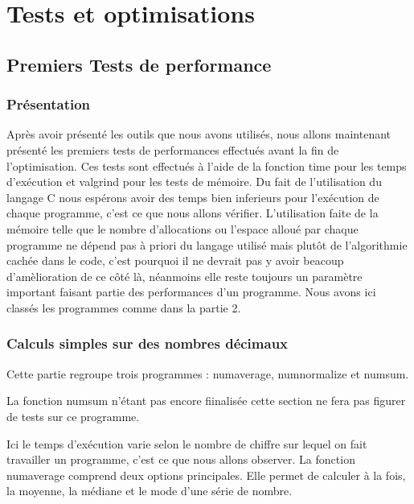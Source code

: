
\chapter{Tests et optimisations}
\label{chap:tests et optimisations}

\section{Premiers Tests de performance}

\subsection{Pr\'esentation}

Apr\`es avoir pr\'esent\'e les outils que nous avons utilis\'es, nous allons maintenant pr\'esent\'e les premiers tests de performances effectu\'es 
avant la fin de l'optimisation.
Ces tests sont effectu\'es \`a l'aide de la fonction time pour les temps d'ex\'ecution et valgrind pour les tests de m\'emoire.
Du fait de l'utilisation du langage C nous esp\'erons avoir des temps bien inferieurs pour l'ex\'ecution de chaque programme, c'est ce que nous allons
 v\'erifier.
L'utilisation faite de la m\'emoire telle que le nombre d'allocations ou l'espace allou\'e par chaque programme ne d\'epend pas \`a priori du langage
 utilis\'e mais plut\^ot de l'algorithmie cach\'ee dans le code, c'est pourquoi il ne devrait pas y avoir beacoup d'am\`elioration de ce c\^ot\'e l\`a,
n\'eanmoins elle reste toujours un param\`etre important faisant partie des performances d'un programme.
Nous avons ici class\'es les programmes comme dans la partie 2.

\subsection{Calculs simples sur des nombres d\'ecimaux}

Cette partie regroupe trois programmes : numaverage, numnormalize et numsum.
\newline

La fonction numsum n'\'etant pas encore fiinalis\'ee cette section ne fera pas figurer de tests sur ce programme.
\newline

Ici le temps d'ex\'ecution varie selon le nombre de chiffre sur lequel on fait travailler un programme, c'est ce que nous allons observer.
La fonction numaverage comprend deux options principales. Elle permet de calculer \`a la fois, la moyenne, la m\'ediane et le mode d'une s\'erie de nombre.
\newline

